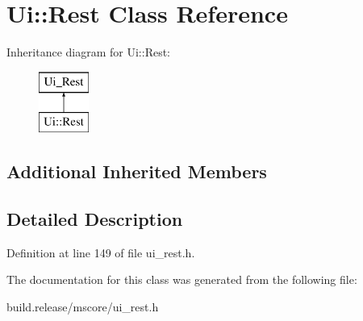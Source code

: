 \hypertarget{class_ui_1_1_rest}{}\section{Ui\+:\+:Rest Class Reference}
\label{class_ui_1_1_rest}
Inheritance diagram for Ui\+:\+:Rest\+:\begin{figure}[H]
\begin{center}
\leavevmode
\includegraphics[height=2.000000cm]{class_ui_1_1_rest}
\end{center}
\end{figure}
\subsection*{Additional Inherited Members}


\subsection{Detailed Description}


Definition at line 149 of file ui\+\_\+rest.\+h.



The documentation for this class was generated from the following file\+:\begin{DoxyCompactItemize}
\item 
build.\+release/mscore/ui\+\_\+rest.\+h\end{DoxyCompactItemize}

